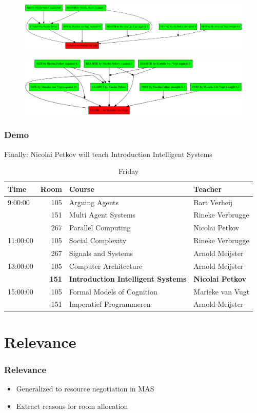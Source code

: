 \documentclass{beamer}
\begin{document}
\begin{frame}[plain]
	\begin{figure}
		\includegraphics[keepaspectratio,width=\textwidth,height=\textheight,]{demo/3}
	\end{figure}
\end{frame}

\begin{frame}[plain]
	\begin{figure}
		\includegraphics[keepaspectratio,width=\textwidth,height=\textheight,]{demo/4}
	\end{figure}
\end{frame}

\begin{frame}
	\frametitle{Demo}
	Finally: Nicolai Petkov will teach Introduction Intelligent Systems
	\fontsize{6}{7.2}\selectfont
	\begin{table}
		\centering
		\caption{Friday}
		\begin{tabular}{l|r|l|l}
			Time & Room & Course & Teacher \\ \hline
			\hline
			9:00:00 & 105 & Arguing Agents & Bart Verheij\\
			& 151 & Multi Agent Systems & Rineke Verbrugge\\
			& 267 & Parallel Computing & Nicolai Petkov\\\hline
			11:00:00 & 105 & Social Complexity & Rineke Verbrugge\\
			& 267 & Signals and Systems & Arnold Meijster\\\hline
			13:00:00 & 105 & Computer Architecture & Arnold Meijster\\
			& \textbf{151} & \textbf{Introduction Intelligent Systems} & \textbf{Nicolai Petkov}\\\hline
			15:00:00 & 105 & Formal Models of Cognition & Marieke van Vugt\\
			& 151 & Imperatief Programmeren & Arnold Meijster\\
			\end{tabular}
	\end{table}
\end{frame}

\section{Relevance}
\begin{frame}
	\frametitle{Relevance}
        \begin{itemize}[<+->]
            \item Generalized to resource negotiation in MAS
            \item Extract reasons for room allocation
        \end{itemize}
\end{frame}

\end{document}
